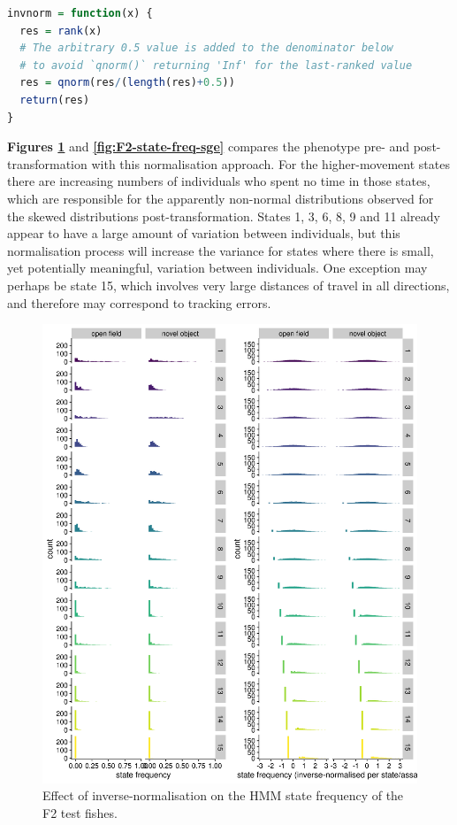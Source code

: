 \documentclass[
]{book}
\begin{document}
\begin{lstlisting}[language=R]
invnorm = function(x) {
  res = rank(x)
  # The arbitrary 0.5 value is added to the denominator below 
  # to avoid `qnorm()` returning 'Inf' for the last-ranked value
  res = qnorm(res/(length(res)+0.5))
  return(res)
}
\end{lstlisting}

\textbf{Figures \ref{fig:F2-state-freq-dge}} and \textbf{\ref{fig:F2-state-freq-sge}} compares the phenotype pre- and post-transformation with this normalisation approach. For the higher-movement states there are increasing numbers of individuals who spent no time in those states, which are responsible for the apparently non-normal distributions observed for the skewed distributions post-transformation. States 1, 3, 6, 8, 9 and 11 already appear to have a large amount of variation between individuals, but this normalisation process will increase the variance for states where there is small, yet potentially meaningful, variation between individuals. One exception may perhaps be state 15, which involves very large distances of travel in all directions, and therefore may correspond to tracking errors.



\begin{figure}
\includegraphics[width=1\linewidth]{figs/mikk_behaviour/0.08_15_state_freq_F2_dge} \caption{Effect of inverse-normalisation on the HMM state frequency of the F2 test fishes.}\label{fig:F2-state-freq-dge}
\end{figure}
\end{document}
